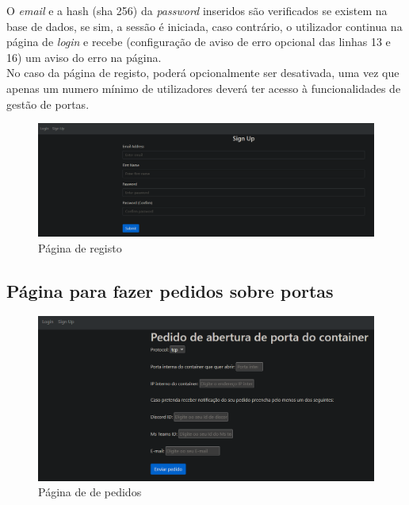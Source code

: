O \textit{email} e a hash (sha 256) da \textit{password} inseridos são verificados 
se existem na base de dados, se sim, a sessão é iniciada, caso contrário, o utilizador 
continua na página de \textit{login} e recebe (configuração de aviso de erro opcional
das linhas 13 e 16) um aviso do erro na página. \\




No caso da página de registo, poderá opcionalmente ser desativada, uma vez que 
apenas um numero mínimo
de utilizadores deverá ter acesso à funcionalidades de gestão de portas. \\

\begin{figure}[H]
\begin{center}
\includegraphics[width=16cm]{figs/registo.png}
\caption{Página de registo}
\label{fig:bookstack}
\end{center}
\end{figure}




\subsection{Página para fazer pedidos sobre portas}

\begin{figure}[H]
\begin{center}
\includegraphics[width=16cm]{figs/pagina de pedidos2.png}
\caption{Página de de pedidos}
\label{fig:bookstack}
\end{center}
\end{figure}

